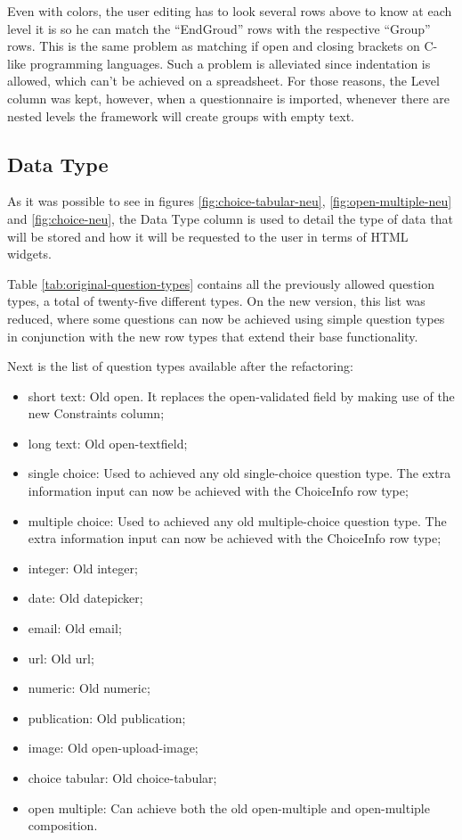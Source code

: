 Even with colors, the user editing has to look several rows above to know at each level it is so he can match the ``EndGroud'' rows with the respective ``Group'' rows.
This is the same problem as matching if open and closing brackets on C-like programming languages.
Such a problem is alleviated since indentation is allowed, which can't be achieved on a spreadsheet.
For those reasons, the Level column was kept, however, when a questionnaire is imported, whenever there are nested levels the framework will create groups with empty text.

\subsection*{Data Type}

As it was possible to see in figures \ref{fig:choice-tabular-neu}, \ref{fig:open-multiple-neu} and \ref{fig:choice-neu}, the Data Type column is used to detail the type of data that will be stored and how it will be requested to the user in terms of HTML widgets.

Table \ref{tab:original-question-types} contains all the previously allowed question types, a total of twenty-five different types.
On the new version, this list was reduced, where some questions can now be achieved using simple question types in conjunction with the new row types that extend their base functionality.

Next is the list of question types available after the refactoring:

\begin{itemize}
    \item short text: Old open. It replaces the open-validated field by making use of the new Constraints column;
    \item long text: Old open-textfield;
    \item single choice: Used to achieved any old single-choice question type. The extra information input can now be achieved with the ChoiceInfo row type;
    \item multiple choice: Used to achieved any old multiple-choice question type. The extra information input can now be achieved with the ChoiceInfo row type;
    \item integer: Old integer;
    \item date: Old datepicker;
    \item email: Old email;
    \item url: Old url;
    \item numeric: Old numeric;
    \item publication: Old publication;
    \item image: Old open-upload-image;
    \item choice tabular: Old choice-tabular;
    \item open multiple: Can achieve both the old open-multiple and open-multiple composition.
\end{itemize}

